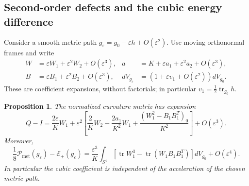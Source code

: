 \documentclass[11pt]{article}
\numberwithin{equation}{section}
\newtheorem{proposition}[theorem]{Proposition}
\theoremstyle{definition}
\theoremstyle{remark}
\begin{document}
\subsection{Second-order defects and the cubic energy difference}

Consider a smooth metric path $g_\varepsilon=g_0+\varepsilon h+
O(\varepsilon^2)$. Use moving orthonormal frames and write
\begin{align}
 W&=\varepsilon W_1+\varepsilon^2W_2+O(\varepsilon^3),&
 a&=K+\varepsilon a_1+\varepsilon^2a_2+O(\varepsilon^3),
 \label{metric:expansions}\\
 B&=\varepsilon B_1+\varepsilon^2B_2+O(\varepsilon^3),&
 dV_{g_\varepsilon}&=(1+\varepsilon v_1+O(\varepsilon^2))dV_{g_0}.
 \nonumber
\end{align}
These are coefficient expansions, without factorials; in particular
$v_1=\tfrac12\operatorname{tr}_{g_0}h$.

\begin{proposition}\label{prop:metric-cubic}
The normalized curvature matrix has expansion
\begin{equation}\label{metric:Q-second-order}
 Q-I=\frac{2\varepsilon}{K}W_1
 +\varepsilon^2\left[
 \frac2K W_2-\frac{2a_1}{K^2}W_1
 +\frac{(W_1^2-B_1B_1^T)_0}{K^2}\right]
 +O(\varepsilon^3).
\end{equation}
Moreover,
\begin{equation}\label{metric:cubic-discrepancy}
 \frac18\mathcal P_{\mathrm{met}}(g_\varepsilon)
 -\mathcal E_+(g_\varepsilon)
 =\frac{\varepsilon^3}{K}\int_{S^4}
 \left[\operatorname{tr}W_1^3
 -\operatorname{tr}(W_1B_1B_1^T)\right]dV_{g_0}
 +O(\varepsilon^4).
\end{equation}
In particular the cubic coefficient is independent of the acceleration
of the chosen metric path.
\end{proposition}
\end{document}
